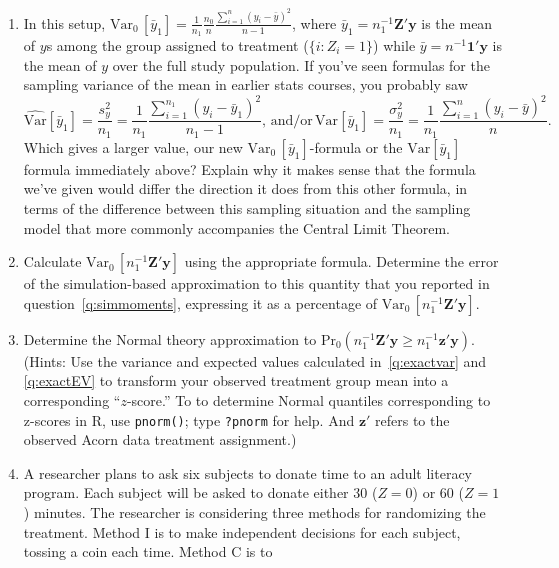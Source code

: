 \documentclass{article}
\begin{document}
\begin{enumerate}
\item In this setup, $\mathrm{Var}_{0}\, [\bar{y}_{1}]  = \frac{1}{n_{1}}
  \frac{n_{0}}{n} \frac{\sum_{i=1}^{n} (y_{i} - \bar y)^{2}}{n-1} $,
  where $\bar{y}_{1} = n_{1}^{-1}\mathbf{Z}'\mathbf{y}$ is the mean of
  $y$s among the group assigned to treatment ($\{i: Z_{i} =1\}$) while
  $\bar{y} = n^{-1}\mathbf{1}'\mathbf{y}$ is the mean of $y$ over
  the full study population.  If you've seen formulas for the sampling
  variance of the mean in earlier stats
  courses, you probably saw
  $$
  \widehat{\mathrm{Var}} \left[\bar{y}_{1}\right] = \frac{s^{2}_{y}}{n_{1}} = \frac{1}{n_{1}}
  \frac{\sum_{i=1}^{n_{1}} (y_{i} - \bar{y}_{1})^{2}}{n_{1}-1}, 
\, \mathrm{and/or}\,
  \mathrm{Var} \left[\bar{y}_{1}\right] = \frac{\sigma_{y}^{2}}{n_{1}} = \frac{1}{n_{1}}
  \frac{\sum_{i=1}^{n} (y_{i} - \bar{y})^{2}}{n}.
  $$
Which gives a larger value, our new $\mathrm{Var}_{0}\,
[\bar{y}_{1}]$-formula or the  $\mathrm{Var} \left[\bar{y}_{1}\right]$
formula immediately above?  Explain why it makes
sense that the formula we've given would differ the direction it does
from this other formula, in terms of the difference between this
sampling situation and the sampling model that more commonly
accompanies the Central Limit Theorem.
\item Calculate $\mathrm{Var}_{0}\, [n_{1}^{-1}\mathbf{Z}'\mathbf{y}]$ using the appropriate
  formula.   Determine the error of the simulation-based
  approximation to this quantity that you reported in question~\ref{q:simmoments},
  expressing it as a percentage of $\mathrm{Var}_{0}\,[ n_{1}^{-1}\mathbf{Z}'\mathbf{y}]$. \label{q:exactvar}
\item Determine the Normal theory approximation to
  $\mathrm{Pr}_{0}(n_{1}^{-1}\mathbf{Z}'\mathbf{y} \geq
  n_{1}^{-1}\mathbf{z}'\mathbf{y} ) $.  (Hints: Use the variance and
  expected values calculated in~\ref{q:exactvar} and \ref{q:exactEV} to transform your
  observed treatment group mean into a corresponding ``$z$-score.'' 
  To to determine Normal quantiles corresponding to z-scores in R, use
  \texttt{pnorm()}; type \texttt{?pnorm} for help. And $\mathbf{z}'$ refers to
  the observed Acorn data treatment assignment.)
\item %
A researcher plans to ask six subjects to donate time to an adult
literacy program. Each subject will be asked to donate either 30
($Z=0$) or 60 ($Z=1$)
minutes. The researcher is considering three methods for randomizing
the treatment. Method I is to make independent decisions for each
subject, tossing a coin each time. Method C is to

\end{enumerate}
\end{document}
